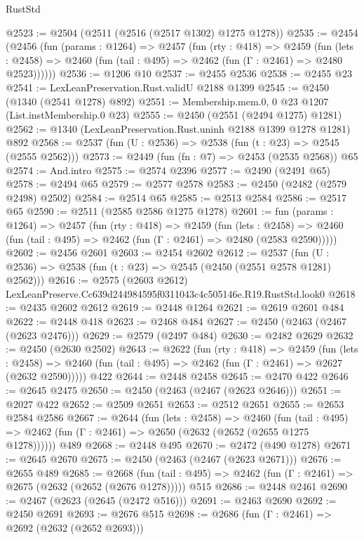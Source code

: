 \begin{lexlean}{RustStd}
\begin{coremodule}
@2523 := @2504 (@2511 (@2516 (@2517 @1302) @1275 @1278))
@2535 := @2454
    (@2456
      (fun (params : @1264) =>
      @2457
        (fun (rty : @418) =>
        @2459
          (fun (lets : @2458) =>
          @2460 (fun (tail : @495) => @2462 (fun (Γ : @2461) => @2480 @2523))))))
@2536 := @1206 @10
@2537 := @2455 @2536
@2538 := @2455 @23
@2541 := LexLeanPreservation.Rust.validU @2188 @1399
@2545 := @2450 (@1340 (@2541 @1278) @892)
@2551 := Membership.mem.{0, 0} @23 @1207 (List.instMembership.{0} @23)
@2555 := @2450 (@2551 (@2494 @1275) @1281)
@2562 := @1340 (LexLeanPreservation.Rust.uninh @2188 @1399 @1278 @1281) @892
@2568 := @2537 (fun (U : @2536) => @2538 (fun (t : @23) => @2545 (@2555 @2562)))
@2573 := @2449 (fun (fn : @7) => @2453 (@2535 @2568)) @65
@2574 := And.intro
@2575 := @2574 @2396
@2577 := @2490 (@2491 @65)
@2578 := @2494 @65
@2579 := @2577 @2578
@2583 := @2450 (@2482 (@2579 @2498) @2502)
@2584 := @2514 @65
@2585 := @2513 @2584
@2586 := @2517 @65
@2590 := @2511 (@2585 @2586 @1275 @1278)
@2601 := fun (params : @1264) =>
  @2457
    (fun (rty : @418) =>
    @2459
      (fun (lets : @2458) =>
      @2460 (fun (tail : @495) => @2462 (fun (Γ : @2461) => @2480 (@2583 @2590)))))
@2602 := @2456 @2601
@2603 := @2454 @2602
@2612 := @2537 (fun (U : @2536) => @2538 (fun (t : @23) => @2545 (@2450 (@2551 @2578 @1281) @2562)))
@2616 := @2575 (@2603 @2612) LexLeanPreserve.Cc639d244984595f0311043c4c505146e.R19.RustStd.look0
@2618 := @2435 @2602 @2612
@2619 := @2448 @1264
@2621 := @2619 @2601 @484
@2622 := @2448 @418
@2623 := @2468 @484
@2627 := @2450 (@2463 (@2467 (@2623 @2476)))
@2629 := @2579 (@2497 @484)
@2630 := @2482 @2629
@2632 := @2450 (@2630 @2502)
@2643 := @2622
    (fun (rty : @418) =>
    @2459
      (fun (lets : @2458) =>
      @2460 (fun (tail : @495) => @2462 (fun (Γ : @2461) => @2627 (@2632 @2590)))))
    @422
@2644 := @2448 @2458
@2645 := @2470 @422
@2646 := @2645 @2475
@2650 := @2450 (@2463 (@2467 (@2623 @2646)))
@2651 := @2027 @422
@2652 := @2509 @2651
@2653 := @2512 @2651
@2655 := @2653 @2584 @2586
@2667 := @2644
    (fun (lets : @2458) =>
    @2460
      (fun (tail : @495) => @2462 (fun (Γ : @2461) => @2650 (@2632 (@2652 (@2655 @1275 @1278))))))
    @489
@2668 := @2448 @495
@2670 := @2472 (@490 @1278)
@2671 := @2645 @2670
@2675 := @2450 (@2463 (@2467 (@2623 @2671)))
@2676 := @2655 @489
@2685 := @2668
    (fun (tail : @495) => @2462 (fun (Γ : @2461) => @2675 (@2632 (@2652 (@2676 @1278)))))
    @515
@2686 := @2448 @2461
@2690 := @2467 (@2623 (@2645 (@2472 @516)))
@2691 := @2463 @2690
@2692 := @2450 @2691
@2693 := @2676 @515
@2698 := @2686 (fun (Γ : @2461) => @2692 (@2632 (@2652 @2693)))

\end{coremodule}
\end{lexlean}
